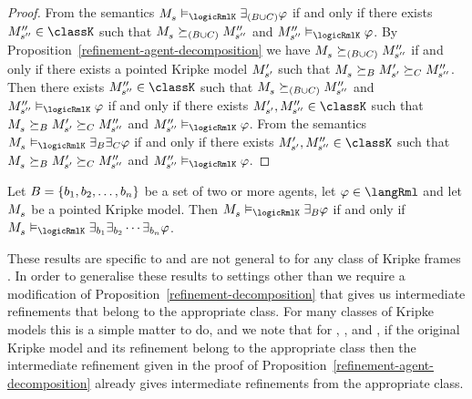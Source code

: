\begin{proof}
From the semantics $\kPModel{\kStateS} \entails_\logicRmlK \somerefs[(\agentsB \cup \agentsC)] \phi$ if and only if there exists $\kPModelPP{\kStateSPP} \in \classK$ such that $\kPModel{\kStateS} \simulates[(\agentsB \cup \agentsC)] \kPModelPP{\kStateSPP}$ and $\kPModelPP{\kStateSPP} \entails_\logicRmlK \phi$.
By Proposition~\ref{refinement-agent-decomposition} we have $\kPModel{\kStateS} \simulates[(\agentsB \cup \agentsC)] \kPModelPP{\kStateSPP}$ if and only if there exists a pointed Kripke model ${M^{\prime}_{{s}^{\prime}}}$ such that $\kPModel{\kStateS} \simulatesBs \kPModelP{\kStateSP} \simulatesCs \kPModelPP{\kStateSPP}$.
Then there exists $\kPModelPP{\kStateSPP} \in \classK$ such that $\kPModel{\kStateS} \simulates[(\agentsB \cup \agentsC)] \kPModelPP{\kStateSPP}$ and $\kPModelPP{\kStateSPP} \entails_\logicRmlK \phi$
if and only if
there exists $\kPModelP{\kStateSP}, \kPModelPP{\kStateSPP} \in \classK$ such that $\kPModel{\kStateS} \simulatesBs \kPModelP{\kStateSP} \simulatesCs \kPModelPP{\kStateSPP}$ and $\kPModelPP{\kStateSPP} \entails_\logicRmlK \phi$.
From the semantics $\kPModel{\kStateS} \entails_\logicRmlK \somerefsBs \somerefsCs \phi$ if and only if there exists $\kPModelP{\kStateSP}, \kPModelPP{\kStateSPP} \in \classK$ such that $\kPModel{\kStateS} \simulatesBs \kPModelP{\kStateSP} \simulatesCs \kPModelPP{\kStateSPP}$ and $\kPModelPP{\kStateSPP} \entails_\logicRmlK \phi$.
\end{proof}

\begin{corollary}
Let $B = \{b_1, b_2, \dots, b_n\}$ be a set of two or more agents, let $\phi \in \langRml$ and let $\kPModel{\kStateS}$ be a pointed Kripke model.
Then $\kPModel{\kStateS} \entails_\logicRmlK \somerefsBs \phi$ if and only if $\kPModel{\kStateS} \entails_\logicRmlK \somerefs[\agentB_1] \somerefs[\agentB_2] \cdots \somerefs[\agentB_n] \phi$.
\end{corollary}

These results are specific to \logicRmlK{} and are not general to \logicRmlC{} for any class of Kripke frames \classC{}.
In order to generalise these results to settings other than \classK{} we require a modification of Proposition~\ref{refinement-decomposition} that gives us intermediate refinements that belong to the appropriate class.
For many classes of Kripke models this is a simple matter to do, and we note that for \classKF{}, \classKFF{}, and \classS{}, if the original Kripke model and its refinement belong to the appropriate class then the intermediate refinement given in the proof of Proposition~\ref{refinement-agent-decomposition} already gives intermediate refinements from the appropriate class.

